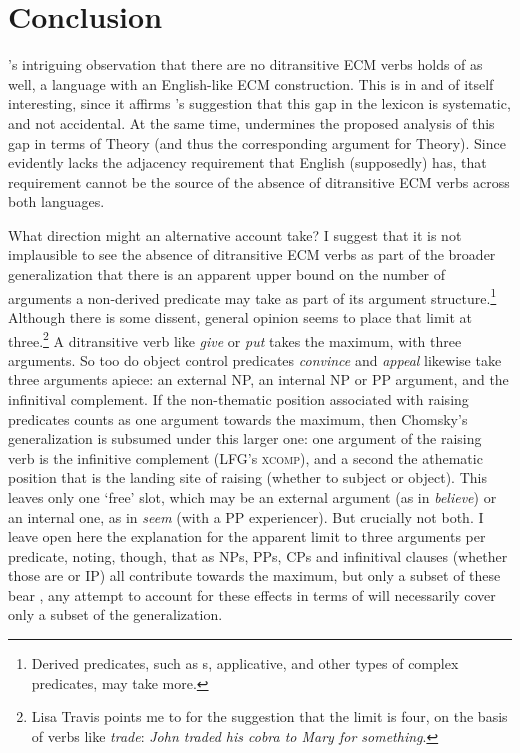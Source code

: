 \documentclass[output=paper]{langsci/langscibook}
\begin{document}
\section{Conclusion}

\citeauthor{Chomsky1980}'s intriguing observation that there are no ditransitive ECM verbs holds of  as well, a language with an English-like ECM construction. This is in and of itself interesting, since it affirms \citeauthor{Chomsky1980}'s suggestion that this gap in the lexicon is systematic, and not accidental. At the same time,  undermines the proposed analysis of this gap in terms of  Theory (and thus the corresponding argument for  Theory). Since  evidently lacks the adjacency requirement that English (supposedly) has, that requirement cannot be the source of the absence of ditransitive ECM verbs across both languages. 

What direction might an alternative account take? I suggest that it is not implausible to see the absence of ditransitive ECM verbs as part of the broader generalization that there is an apparent upper bound on the number of arguments a non-derived predicate may take as part of its argument structure.\footnote{Derived predicates, such as s, applicative, and other types of complex predicates, may take more.} Although there is some dissent, general opinion seems to place that limit at three.\footnote{Lisa Travis points me to \cite{Carter76} for the suggestion that the limit is four, on the basis of verbs like \textit{trade}: \textit{John traded his cobra to Mary for something}.} A ditransitive verb like \textit{give} or \textit{put} takes the maximum, with three arguments. So too do object control predicates \textit{convince} and \textit{appeal} likewise take three arguments apiece: an external NP, an internal NP or PP argument, and the infinitival complement. If the non-thematic position associated with raising predicates counts as one argument towards the maximum, then Chomsky's generalization is subsumed under this larger one: one argument of the raising verb is the infinitive complement (LFG's {\scshape xcomp}), and a second the athematic position that is the landing site of raising (whether to subject or object). This leaves only one `free' slot, which may be an external argument (as in \textit{believe}) or an internal one, as in \textit{seem} (with a PP experiencer). But crucially not both. I leave open here the explanation for the apparent limit to three arguments per predicate, noting, though, that as NPs, PPs, CPs and infinitival clauses (whether those are  or IP) all contribute towards the maximum, but only a subset of these bear , any attempt to account for these effects in terms of  will necessarily cover only a subset of the generalization. 
\end{document}
